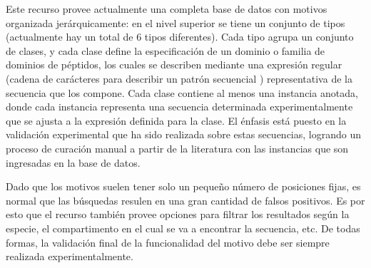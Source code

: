 Este recurso provee actualmente una completa base de datos con motivos organizada jerárquicamente: en el nivel superior se tiene un conjunto de tipos (actualmente hay un total de 6 tipos diferentes). 
Cada tipo agrupa un conjunto de clases, y cada clase define la especificación de un dominio o familia de dominios de péptidos, 
los cuales se describen mediante una expresión regular (cadena de carácteres para describir un patrón secuencial \cite{regex}) representativa de la secuencia que los compone.
Cada clase contiene al menos una instancia anotada, donde cada instancia representa una secuencia determinada experimentalmente que se ajusta a la expresión definida para la clase.
El énfasis está puesto en la validación experimental que ha sido realizada sobre estas secuencias, logrando un proceso de curación manual a partir de la literatura con las instancias que son ingresadas en la base de datos.

Dado que los motivos suelen tener solo un pequeño número de posiciones fijas, es normal que las búsquedas resulen en una gran cantidad de falsos positivos.  
Es por esto que el recurso también provee opciones para filtrar los resultados según la especie, el compartimento en el cual se va a encontrar la secuencia, etc. 
De todas formas, la validación final de la funcionalidad del motivo debe ser siempre realizada experimentalmente.



